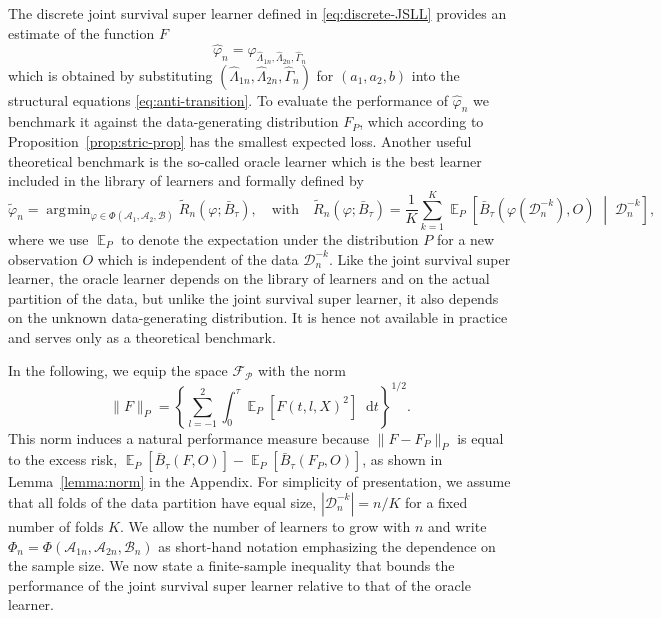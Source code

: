 \documentclass[alpha-refs]{wiley-article}
\DeclareMathOperator{\E}{\mathbb{E}} %
\renewcommand{\phi}{\varphi}
\newcommand*\diff{\mathop{}\!\mathrm{d}}
\newcommand{\midd}{\; \middle|\;}
\newcommand{\1}{\mathds{1}}
\DeclareMathOperator*{\argmin}{\arg\!\min}
\newcommand{\data}{\ensuremath{\mathcal{D}}}
\begin{document}
The discrete joint survival super learner defined in
\eqref{eq:discrete-JSLL} provides an estimate of the function \(F\)
\begin{equation*}
  \hat{\phi}_n=\phi_{\hat \Lambda_{1n},\hat \Lambda_{2n}, \hat \Gamma_{n}}
\end{equation*} which is obtained by substituting \((\hat
\Lambda_{1n},\hat \Lambda_{2n}, \hat \Gamma_{n})\) for \((a_1,a_2,b)\) into the structural
equations \eqref{eq:anti-transition}. To evaluate the performance of
\(\hat{\phi}_n\) we benchmark it against the data-generating
distribution \( F_P \), which according to
Proposition~\ref{prop:stric-prop} has the smallest expected
loss. Another useful theoretical benchmark is the so-called oracle
learner which is the best learner included in the library of learners
and formally defined by
\begin{equation*}
  \tilde{\phi}_n
  =  \argmin_{\phi \in \Phi(\mathcal{A}_1, \mathcal{A}_2, \mathcal{B}) }
  \tilde{R}_{n}(\phi ; \bar{B}_{\tau}),
  \quad \text{with} \quad 
  \tilde{R}_n(\phi; \bar{B}_{\tau})=
  \frac{1}{K}\sum_{k=1}^{K} 
  \E_P{
    \left[
      \bar{B}_{\tau}
      {
        \left(
          \phi{ (\data_n^{-k})}
          , O
        \right)
      } 
      \midd  \data_n^{-k}
    \right]}
  ,
\end{equation*}
where we use \( \E_P \) to denote the expectation
under the distribution \( P \) for a new observation \( O \) which is
independent of the data \( \data_n^{-k} \). Like the joint survival
super learner, the oracle learner depends on the library of learners
and on the actual partition of the data, but unlike the joint survival
super learner, it also depends on the unknown data-generating
distribution. It is hence not available in practice and serves only as
a theoretical benchmark.

In the following, we equip the space \( \mathcal{F}_{\mathcal{P}} \)
with the norm
\begin{equation}
  \label{eq:norm}
  \| F \|_{P} = 
  \left\{
    \sum_{l=-1}^{2}
    \int_0^{\tau} \E_P{\left[ F(t, l, X)^2 \right]} \diff t
  \right\}^{1/2}.
\end{equation}
This norm induces a natural performance measure because
$\| F-F_P \|_{P}$ is equal to the excess risk,
\( \E_P{[\bar{B}_\tau(F, O)]} - \E_P{[\bar{B}_\tau(F_P, O)]} \), as
shown in Lemma~\ref{lemma:norm} in the Appendix. For simplicity of
presentation, we assume that all folds of the data partition have
equal size, \( |\data_n^{-k}| = n/K \) for a fixed number of folds
\( K \). We allow the number of learners to grow with \( n \) and
write
\( \Phi_n=\Phi(\mathcal{A}_{1n}, \mathcal{A}_{2n},
\mathcal{B}_n)\) as short-hand notation emphasizing the dependence on
the sample size. We now state a finite-sample inequality that bounds
the performance of the joint survival super learner relative to that
of the oracle learner.
\end{document}
